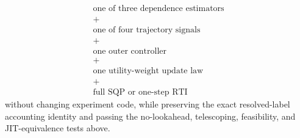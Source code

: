 \documentclass[11pt]{article}
\begin{document}
\[
\boxed{
\begin{array}{c}
\text{one of three dependence estimators}
\\
+
\\
\text{one of four trajectory signals}
\\
+
\\
\text{one outer controller}
\\
+
\\
\text{one utility-weight update law}
\\
+
\\
\text{full SQP or one-step RTI}
\end{array}
}
\]
without changing experiment code, while preserving the exact resolved-label
accounting identity and passing the no-lookahead, telescoping, feasibility,
and JIT-equivalence tests above.
\end{document}
